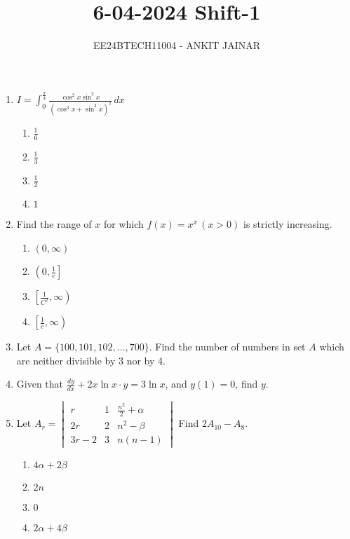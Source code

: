 \documentclass[journal,12pt,onecolumn]{IEEEtran}
\theoremstyle{remark}
\begin{document}

\vspace{3cm}

\title{\textbf{6-04-2024 Shift-1}}
\author{EE24BTECH11004 - ANKIT JAINAR}
\maketitle
\bigskip

\renewcommand{\thefigure}{\theenumi}
\renewcommand{\thetable}{\theenumi}
\setlength{\columnsep}{2.5em}
\begin{enumerate}
\item $I = \int_{0}^{\frac{\pi}{4}} \frac{\cos^2 x \sin^2 x}{\left( \cos^3 x + \sin^3 x \right)^2} \, dx$
\begin{enumerate}
    \item $\frac{1}{6}$
    \item $\frac{1}{3}$
    \item $\frac{1}{2}$
    \item $1$
\end{enumerate}
\item Find the range of $x$ for which $f(x) = x^x \, (x > 0)$ is strictly increasing.
\begin{enumerate}
    \item $ (0, \infty) $
    \item $ \left( 0, \frac{1}{e} \right] $
    \item $ \left[ \frac{1}{C^2}, \infty \right) $
    \item $ \left[ \frac{1}{e}, \infty \right) $
\end{enumerate}
\item Let $A = \{100, 101, 102, \dots, 700\}$. Find the number of numbers in set $A$ which are neither divisible by 3 nor by 4.
\item Given that $\frac{dy}{dx} + 2x \ln{x} \cdot y = 3 \ln{x}$, and $y(1) = 0$, find $y$.
\item Let 
$A_r = \begin{vmatrix}
r & 1 & \frac{n^2}{2} + \alpha \\
2r & 2 & n^2 - \beta \\
3r - 2 & 3 & n(n-1)
\end{vmatrix}$
Find $2A_{10} - A_8$.
\begin{enumerate}
    \item $ 4\alpha + 2\beta $
    \item $ 2n $
    \item $ 0 $
    \item $ 2\alpha + 4\beta $

\end{enumerate}
\end{enumerate}
\end{document}
